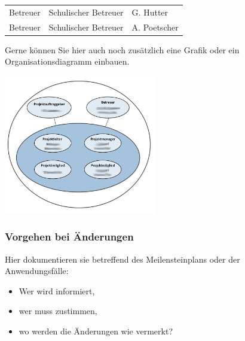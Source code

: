 \documentclass[
    headings=optiontotocandhead,%
    twoside,
    numbers=noenddot,%
    12pt, %
    titlepage, %
    parskip=full, %
    listof=leveldown, 
    numbers=noenddot, %
    a4paper,DIV=14,
    BCOR=15mm,
]{scrbook}
\let\origfigure=\figure
\let\endorigfigure=\endfigure
\renewenvironment{figure}[1][]{%
   \origfigure[H]
}{%
   \endorigfigure
}
\providecommand{\tightlist}{%
  \setlength{\itemsep}{0pt}\setlength{\parskip}{0pt}}
\begin{document}
\begin{longtable}[]{@{}lll@{}}
\begin{minipage}[t]{0.33\columnwidth}\raggedright
Betreuer\strut
\end{minipage} & \begin{minipage}[t]{0.33\columnwidth}\raggedright
Schulischer Betreuer\strut
\end{minipage} & \begin{minipage}[t]{0.26\columnwidth}\raggedright
G. Hutter\strut
\end{minipage}\tabularnewline
\begin{minipage}[t]{0.33\columnwidth}\raggedright
Betreuer\strut
\end{minipage} & \begin{minipage}[t]{0.33\columnwidth}\raggedright
Schulischer Betreuer\strut
\end{minipage} & \begin{minipage}[t]{0.26\columnwidth}\raggedright
A. Poetscher\strut
\end{minipage}\tabularnewline
\bottomrule
\end{longtable}

Gerne können Sie hier auch noch zusätzlich eine Grafik oder ein
Organisationsdiagramm einbauen.

\begin{figure}
\centering
\includegraphics[width=0.5\textwidth,height=\textheight]{img/projektorganisation.png}
\caption{Projektorganisationsdiagramm}
\end{figure}

\hypertarget{vorgehen-bei-uxe4nderungen}{%
\subsubsection{Vorgehen bei
Änderungen}\label{vorgehen-bei-uxe4nderungen}}

Hier dokumentieren sie betreffend des Meilensteinplans oder der
Anwendungsfälle:

\begin{itemize}
\tightlist
\item
  Wer wird informiert,
\item
  wer muss zustimmen,
\item
  wo werden die Änderungen wie vermerkt?
\end{itemize}
\end{document}
